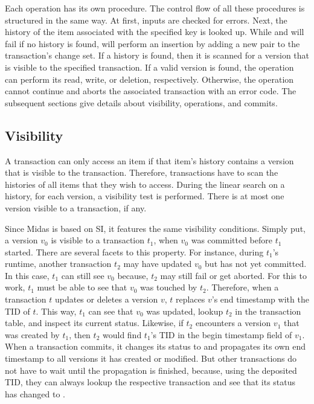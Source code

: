 %

Each operation has its own procedure. The control flow of all these procedures is structured in the same way. At first, inputs are checked for errors. Next, the history of the item associated with the specified key is looked up. While  and  will fail if no history is found,  will perform an insertion by adding a new pair to the transaction's change set. If a history is found, then it is scanned for a version that is visible to the specified transaction. If a valid version is found, the operation can perform its read, write, or deletion, respectively. Otherwise, the operation cannot continue and aborts the associated transaction with an error code. The subsequent sections give details about visibility, operations, and commits.

\subsection{Visibility}
\label{ch:impl-vsb}

A transaction can only access an item if that item's history contains a version that is visible to the transaction. Therefore, transactions have to scan the histories of all items that they wish to access. During the linear search on a history, for each version, a visibility test is performed. There is at most one version visible to a transaction, if any.

Since Midas is based on SI, it features the same visibility conditions. Simply
put, a version $v_0$ is visible to a transaction $t_1$, when $v_0$ was committed
before $t_1$ started. There are several facets to this property. For instance,
during $t_1$'s runtime, another transaction $t_2$ may have updated $v_0$ but has
not yet committed. In this case, $t_1$ can still see $v_0$ because, $t_2$ may
still fail or get aborted. For this to work, $t_1$ must be able to see that
$v_0$ was touched by $t_2$. Therefore, when a transaction $t$ updates or deletes
a version $v$, $t$ replaces $v$'s end timestamp with the TID of $t$. This way,
$t_1$ can see that $v_0$ was updated, lookup $t_2$ in the transaction table, and
inspect its current status. Likewise, if $t_2$ encounters a version $v_1$ that
was created by $t_1$, then $t_2$ would find $t_1$'s TID in the begin timestamp
field of $v_1$. When a transaction commits, it changes its status to
 and propagates its own end timestamp to all versions it has
created or modified. But other transactions do not have to wait until the
propagation is finished, because, using the deposited TID, they can always
lookup the respective transaction and see that its status has changed to
.

